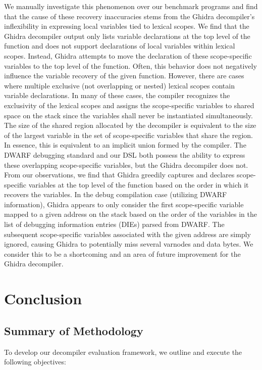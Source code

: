 \documentclass[conference]{IEEEtran}
\begin{document}
We manually investigate this phenomenon over our benchmark programs and find that the cause of these recovery inaccuracies stems from the Ghidra decompiler's inflexibility in expressing local variables tied to lexical scopes. We find that the Ghidra decompiler output only lists variable declarations at the top level of the function and does not support declarations of local variables within lexical scopes. Instead, Ghidra attempts to move the declaration of these scope-specific variables to the top level of the function. Often, this behavior does not negatively influence the variable recovery of the given function. However, there are cases where multiple exclusive (not overlapping or nested) lexical scopes contain variable declarations. In many of these cases, the compiler recognizes the exclusivity of the lexical scopes and assigns the scope-specific variables to shared space on the stack since the variables shall never be instantiated simultaneously. The size of the shared region allocated by the decompiler is equivalent to the size of the largest variable in the set of scope-specific variables that share the region. In essence, this is equivalent to an implicit union formed by the compiler. The DWARF debugging standard and our DSL both possess the ability to express these overlapping scope-specific variables, but the Ghidra decompiler does not. From our observations, we find that Ghidra greedily captures and declares scope-specific variables at the top level of the function based on the order in which it recovers the variables. In the debug compilation case (utilizing DWARF information), Ghidra appears to only consider the first scope-specific variable mapped to a given address on the stack based on the order of the variables in the list of debugging information entries (DIEs) parsed from DWARF. The subsequent scope-specific variables associated with the given address are simply ignored, causing Ghidra to potentially miss several varnodes and data bytes. We consider this to be a shortcoming and an area of future improvement for the Ghidra decompiler.

\section{Conclusion}

\subsection{Summary of Methodology}

To develop our decompiler evaluation framework, we outline and execute the following objectives:
\end{document}
